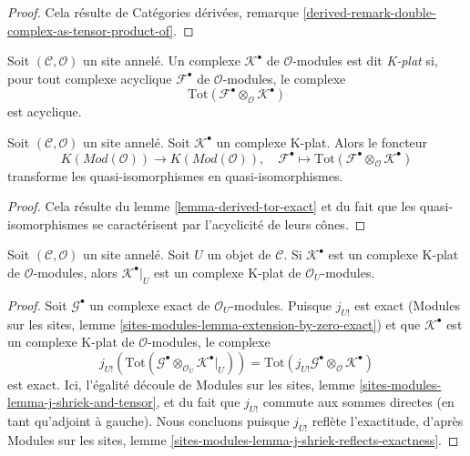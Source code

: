 \begin{proof}
Cela résulte de Catégories dérivées, remarque
\ref{derived-remark-double-complex-as-tensor-product-of}.
\end{proof}

\begin{definition}
\label{definition-K-flat}
Soit $(\mathcal{C}, \mathcal{O})$ un site annelé.
Un complexe $\mathcal{K}^\bullet$ de $\mathcal{O}$-modules est dit
{\it K-plat} si, pour tout complexe acyclique $\mathcal{F}^\bullet$ de
$\mathcal{O}$-modules, le complexe
$$
\text{Tot}(\mathcal{F}^\bullet \otimes_\mathcal{O} \mathcal{K}^\bullet)
$$
est acyclique.
\end{definition}

\begin{lemma}
\label{lemma-K-flat-quasi-isomorphism}
Soit $(\mathcal{C}, \mathcal{O})$ un site annelé.
Soit $\mathcal{K}^\bullet$ un complexe K-plat.
Alors le foncteur
$$
K(\textit{Mod}(\mathcal{O}))
\longrightarrow
K(\textit{Mod}(\mathcal{O})), \quad
\mathcal{F}^\bullet
\longmapsto
\text{Tot}(\mathcal{F}^\bullet \otimes_\mathcal{O} \mathcal{K}^\bullet)
$$
transforme les quasi-isomorphismes en quasi-isomorphismes.
\end{lemma}

\begin{proof}
Cela résulte du lemme \ref{lemma-derived-tor-exact} et du fait que les
quasi-isomorphismes se caractérisent par l'acyclicité de leurs cônes.
\end{proof}

\begin{lemma}
\label{lemma-restriction-K-flat}
Soit $(\mathcal{C}, \mathcal{O})$ un site annelé.
Soit $U$ un objet de $\mathcal{C}$.
Si $\mathcal{K}^\bullet$ est un complexe K-plat de $\mathcal{O}$-modules,
alors $\mathcal{K}^\bullet|_U$ est un complexe K-plat de
$\mathcal{O}_U$-modules.
\end{lemma}

\begin{proof}
Soit $\mathcal{G}^\bullet$ un complexe exact de $\mathcal{O}_U$-modules.
Puisque $j_{U!}$ est exact (Modules sur les sites,
lemme \ref{sites-modules-lemma-extension-by-zero-exact}) et que
$\mathcal{K}^\bullet$ est un complexe K-plat de $\mathcal{O}$-modules, le
complexe
$$
j_{U!}(\text{Tot}(\mathcal{G}^\bullet \otimes_{\mathcal{O}_U}
\mathcal{K}^\bullet|_U)) =
\text{Tot}(j_{U!}\mathcal{G}^\bullet \otimes_\mathcal{O} \mathcal{K}^\bullet)
$$
est exact. Ici, l'égalité découle de Modules sur les sites,
lemme \ref{sites-modules-lemma-j-shriek-and-tensor}, et du fait que $j_{U!}$
commute aux sommes directes (en tant qu'adjoint à gauche).
Nous concluons puisque $j_{U!}$ reflète l'exactitude, d'après Modules sur les
sites, lemme \ref{sites-modules-lemma-j-shriek-reflects-exactness}.
\end{proof}

